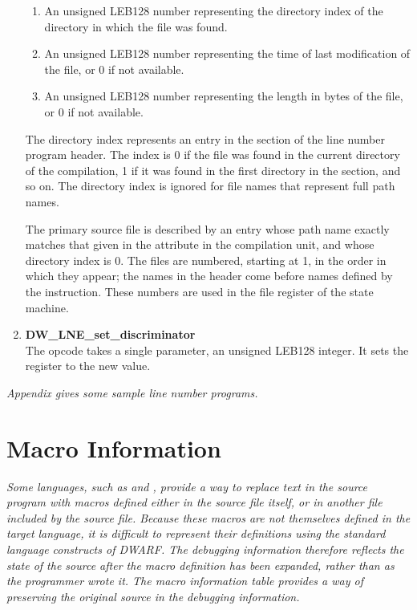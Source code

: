 \begin{enumerate}[1. ]
\begin{enumerate}[1. ]
\item An unsigned LEB128 
number representing the directory index
of the directory in which the file was found.  

\item An unsigned LEB128 
number representing the time of last modification
of the file, or 0 if not available.  

\item An unsigned LEB128
number representing the length in bytes of the file, or 0 if
not available.
\end{enumerate}

The directory index represents an entry in the
 section of the line number program
header. The index is 0 if the file was found in the current
directory of the compilation, 1 if it was found in the first
directory in the  section,
and so on. The
directory index is ignored for file names that represent full
path names.

The primary source file is described by an entry whose path
name exactly matches that given in the  attribute
in the compilation unit, and whose directory index is 0. The
files are numbered, starting at 1, in the order in which they
appear; the names in the header come before names defined by
the  instruction. These numbers are used
in the file register of the state machine.

\item \textbf{DW\-\_LNE\-\_set\-\_discriminator} \\
The 
opcode takes a single
parameter, an unsigned LEB128 
integer. It sets the
 register to the new value.

\end{enumerate}

\textit{Appendix  
gives some sample line number programs.}

\section{Macro Information}
\label{chap:macroinformation}
\textit{Some languages, such as 
 and 
, provide a way to replace
text in the source program with macros defined either in the
source file itself, or in another file included by the source
file.  Because these macros are not themselves defined in the
target language, it is difficult to represent their definitions
using the standard language constructs of DWARF. The debugging
information therefore reflects the state of the source after
the macro definition has been expanded, rather than as the
programmer wrote it. The macro information table provides a way
of preserving the original source in the debugging information.}

